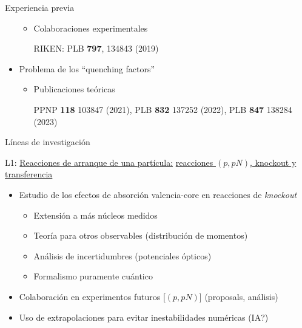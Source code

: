 \documentclass{beamer}
\begin{document}
\begin{frame}{Experiencia previa}
\begin{minipage}{0.45\textwidth}
\begin{itemize}
\begin{itemize}
    \item Colaboraciones experimentales
    
     RIKEN: PLB \textbf{797}, 134843 (2019)   
    
    \end{itemize}
    \item Problema de los ``quenching factors''
    
    \begin{itemize}
    \tiny
    \item Publicaciones teóricas
    
    PPNP \textbf{118} 103847 (2021), PLB \textbf{832} 137252 (2022), PLB \textbf{847} 138284 (2023)
\end{itemize}        
    
    \end{itemize}
    \end{minipage}
    
\end{frame}

\begin{frame}{Líneas de investigación} 

\large {}  L1: \underline{Reacciones de arranque de una partícula:} \underline{reacciones $(p, pN )$, knockout y transferencia}

\normalsize
    
\begin{itemize}
\item Estudio de los efectos de absorción valencia-core en reacciones de \textit{knockout}
\begin{itemize}
\item Extensión a más núcleos medidos
\item Teoría para otros observables (distribución de momentos)
\item Análisis de incertidumbres (potenciales ópticos)
\item Formalismo puramente cuántico
\end{itemize}

\item Colaboración en experimentos futuros [$(p,pN)$] (proposals, análisis)
\item Uso de extrapolaciones para evitar inestabilidades numéricas (IA?)
\end{itemize}    
    
\end{frame}
\end{document}
